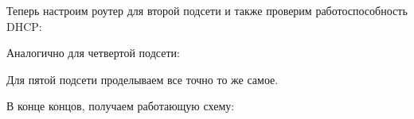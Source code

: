 Теперь настроим роутер для второй подсети и также проверим работоспособность DHCP:
\begin{figure}[h]
\begin{minipage}[h]{0.45\linewidth}
	\center{\texttt{[image: 4]}}
\end{minipage}
\hfill
\begin{minipage}[h]{0.45\linewidth}
	\center{\texttt{[image: 3]}}
\end{minipage}
\label{ris:image1}
\end{figure}
\newpage
Аналогично для четвертой подсети:
\begin{figure}[h]
	\begin{minipage}[h]{0.45\linewidth}
		\center{\texttt{[image: 5]}}
	\end{minipage}
	\hfill
	\begin{minipage}[h]{0.45\linewidth}
		\center{\texttt{[image: 6]}}
	\end{minipage}
	\label{ris:image1}
\end{figure}

Для пятой подсети проделываем все точно то же самое.

\begin{figure}[h]
\end{figure}
\newpage
В конце концов, получаем работающую схему:

\begin{figure}[h]
\end{figure}

